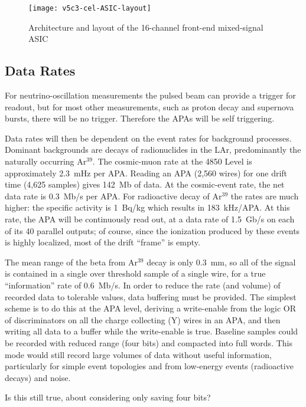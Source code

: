 \begin{figure}[htbp]
\centering
\texttt{[image: v5c3-cel-ASIC-layout]}
\caption{Architecture and layout of the 16-channel front-end mixed-signal ASIC}
\label{fig:ce-elec-asic-layout}
\end{figure}

%
\subsection{Data Rates}
\label{subsec:fe-arch-rates}

For neutrino-oscillation measurements the pulsed beam can provide a
trigger for readout, but for most other measurements, such as proton decay
and supernova bursts, there will be no trigger.  Therefore the APAs will be
self triggering.  

Data rates will then
be dependent on the event rates for background processes.  Dominant
backgrounds are decays of radionuclides in the LAr,
predominantly the naturally occurring Ar$^{39}$.  The cosmic-muon rate at the 4850 Level is approximately 2.3~mHz per APA.  Reading an APA (2,560 wires) for
one drift time (4,625 samples) gives 142~Mb of data. At the cosmic-event rate,
the net data rate is 0.3~Mb/s per APA.  For radioactive decay of Ar$^{39}$
the rates are much higher: the specific activity is 1~Bq/kg which results in 183~kHz/APA.
At this rate, the APA will be continuously read out,
at a data rate of 1.5~Gb/s on each of its 40 parallel outputs;
of course, since the ionization produced by these events is highly localized,
most of the drift ``frame'' is empty.

The mean range of the beta from Ar$^{39}$ decay is only 0.3~mm, so all
of the signal is contained in a single over threshold sample of a single wire, for a true ``information''
rate of 0.6~Mb/s.
In order to
reduce the rate (and volume) of recorded data to tolerable values, 
data buffering must be provided.
The simplest scheme is to do this at the APA level, deriving
a write-enable from the logic OR of discriminators on all the charge
collecting (Y) wires in an APA, and then writing all data to a buffer
while the write-enable is true.
Baseline samples could be recorded
with reduced range (four bits) and compacted into full words.
This mode would still record large volumes of data without useful
information, particularly for simple event topologies and from low-energy 
events (radioactive decays) and noise. 
\begin{editornote}
  Is this still true, about considering only saving four bits?
\end{editornote}

